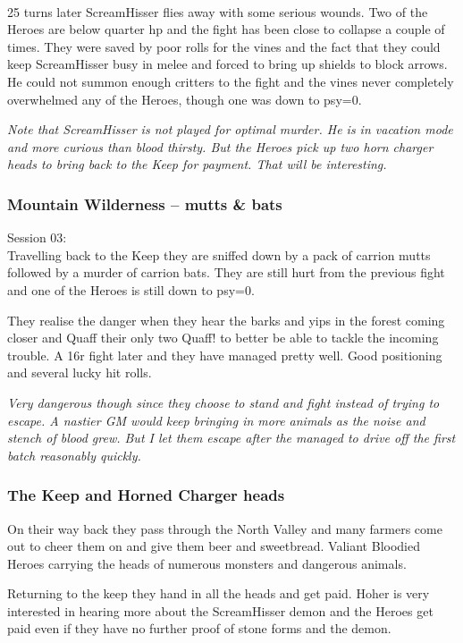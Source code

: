 \

25 turns later ScreamHisser flies away with some serious wounds. Two of the Heroes are below quarter hp and the fight has been close to collapse a couple of times. They were saved by poor rolls for the vines and the fact that they could keep ScreamHisser busy in melee and forced to bring up shields to block arrows. He could not summon enough critters to the fight and the vines never completely overwhelmed any of the Heroes, though one was down to psy=0.

\textit{Note that ScreamHisser is not played for optimal murder. He is in vacation mode and more curious than blood thirsty. But the Heroes pick up two horn charger heads to bring back to the Keep for payment. That will be interesting.}


\subsubsection*{Mountain Wilderness -- mutts \& bats}
\forceindent Session 03:\\                                              %
Travelling back to the Keep they are sniffed down by a pack of carrion mutts followed by a murder of carrion bats.
They are still hurt from the previous fight and one of the Heroes is still down to psy=0.

They realise the danger when they hear the barks and yips in the forest coming closer and Quaff their only two Quaff! to better be able to tackle the incoming trouble.
A 16r fight later and they have managed pretty well. Good positioning and several lucky hit rolls.

\textit{Very dangerous though since they choose to stand and fight instead of trying to escape. A nastier GM would keep bringing in more animals as the noise and stench of blood grew. But I let them escape after the managed to drive off the first batch reasonably quickly.}


\subsubsection*{The Keep and Horned Charger heads}
On their way back they pass through the North Valley and many farmers come out to cheer them on and give them beer and sweetbread. Valiant Bloodied Heroes carrying the heads of numerous monsters and dangerous animals.

Returning to the keep they hand in all the heads and get paid. Hoher is very interested in hearing more about the ScreamHisser demon and the Heroes get paid even if they have no further proof of stone forms and the demon.

